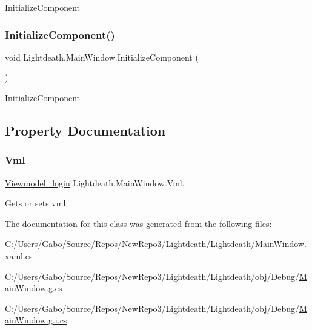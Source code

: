 Initialize\+Component 

\hypertarget{class_lightdeath_1_1_main_window_a45aa2740eadb2180828832d1994a1307}{}\label{class_lightdeath_1_1_main_window_a45aa2740eadb2180828832d1994a1307} 
\subsubsection{\texorpdfstring{Initialize\+Component()}{InitializeComponent()}\hspace{0.1cm}{\footnotesize\ttfamily [2/2]}}
{\footnotesize\ttfamily void Lightdeath.\+Main\+Window.\+Initialize\+Component (\begin{DoxyParamCaption}{ }\end{DoxyParamCaption})\hspace{0.3cm}{\ttfamily [inline]}}



Initialize\+Component 



\subsection{Property Documentation}
\hypertarget{class_lightdeath_1_1_main_window_a20f7b90c8fb41a8c0001ab02d2b37044}{}\label{class_lightdeath_1_1_main_window_a20f7b90c8fb41a8c0001ab02d2b37044} 
\subsubsection{\texorpdfstring{Vml}{Vml}}
{\footnotesize\ttfamily \hyperlink{class_lightdeath_1_1_viewmodel__login}{Viewmodel\+\_\+login} Lightdeath.\+Main\+Window.\+Vml\hspace{0.3cm}{\ttfamily [get]}, {\ttfamily [set]}}



Gets or sets vml 



The documentation for this class was generated from the following files\+:\begin{DoxyCompactItemize}
\item 
C\+:/\+Users/\+Gabo/\+Source/\+Repos/\+New\+Repo3/\+Lightdeath/\+Lightdeath/\hyperlink{_main_window_8xaml_8cs}{Main\+Window.\+xaml.\+cs}\item 
C\+:/\+Users/\+Gabo/\+Source/\+Repos/\+New\+Repo3/\+Lightdeath/\+Lightdeath/obj/\+Debug/\hyperlink{_main_window_8g_8cs}{Main\+Window.\+g.\+cs}\item 
C\+:/\+Users/\+Gabo/\+Source/\+Repos/\+New\+Repo3/\+Lightdeath/\+Lightdeath/obj/\+Debug/\hyperlink{_main_window_8g_8i_8cs}{Main\+Window.\+g.\+i.\+cs}\end{DoxyCompactItemize}
